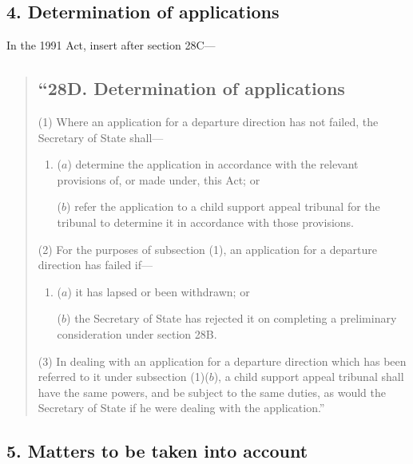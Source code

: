 \documentclass[a4paper]{article}
\begin{document}
\subsection{4. Determination of applications}

In the 1991 Act, insert after section 28C—
\begin{quotation}
\subsection*{“28D. Determination of applications}

(1) Where an application for a departure direction has not failed, the Secretary of State shall—
\begin{enumerate}\item[]
($a$) determine the application in accordance with the relevant provisions of, or made under, this Act; or

($b$) refer the application to a child support appeal tribunal for the tribunal to determine it in accordance with those provisions.
\end{enumerate}

(2) For the purposes of subsection (1), an application for a departure direction has failed if—
\begin{enumerate}\item[]
($a$) it has lapsed or been withdrawn; or

($b$) the Secretary of State has rejected it on completing a preliminary consideration under section 28B.
\end{enumerate}

(3) In dealing with an application for a departure direction which has been referred to it under subsection (1)($b$), a child support appeal tribunal shall have the same powers, and be subject to the same duties, as would the Secretary of State if he were dealing with the application.” 
\end{quotation}

\subsection{5. Matters to be taken into account}
\end{document}
